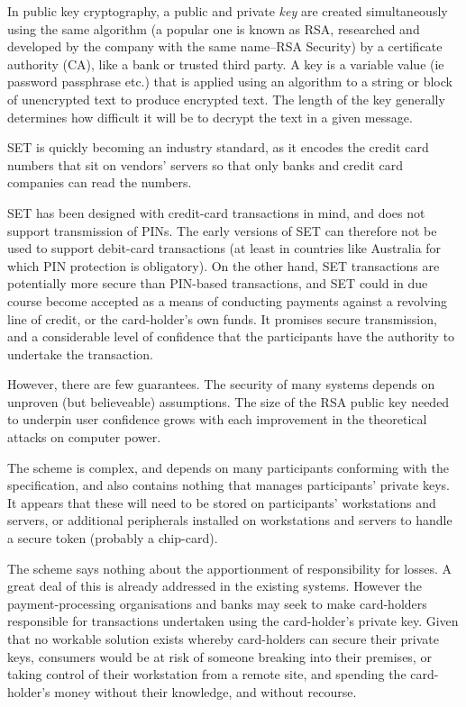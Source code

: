 \documentclass[11pt,a4paper,twoside,notitlepage]{article}
\begin{document}
	In public key cryptography, a public and private \emph{key} are created
simultaneously using the same algorithm (a popular one is known as RSA, researched and developed by the company with
the same name--RSA Security)
by a certificate authority (CA), like a bank or trusted third party\cite{Horadam:Age99}.
A key is a variable value (ie password passphrase etc.) that is applied using an algorithm 
to a string or block 
of unencrypted text to produce encrypted text. The
length of the key generally determines how difficult it will be to decrypt the text in a given message.

 SET is quickly becoming an industry standard, as it encodes
the credit card
numbers that sit on vendors' servers so that only banks and credit card companies can read the 
numbers\cite{Clarke:url99}.

SET has been designed with credit-card transactions in mind, and does not support transmission of PINs.
The early versions of SET can therefore not be used to
support debit-card transactions (at least in countries like Australia for which PIN protection is obligatory).
On the other hand, SET transactions are potentially
more secure than PIN-based transactions, and SET could in due course become accepted as a means of conducting
payments against a revolving line of credit,
or the card-holder's own funds.
It promises secure transmission, and a considerable level of confidence that the participants have the authority to undertake the transaction.


However, there are few guarantees.  The security of many systems depends on unproven (but believeable)
assumptions.  The size of the RSA public key needed to underpin user confidence grows with each 
improvement in the theoretical attacks on computer power\cite{Horadam:Age99}.

The scheme is complex, and depends on many participants conforming with the specification, and also
contains nothing that manages participants' private keys. It appears that these will need to be stored on 
participants' workstations and servers, or
additional peripherals installed on workstations and servers to handle a secure token (probably a chip-card).

The scheme says nothing about the apportionment of responsibility for losses. A great deal of this 
is already addressed
in the existing systems. However the
payment-processing organisations and banks may seek to make card-holders responsible for transactions undertaken
using the card-holder's private key. Given
that no workable solution exists whereby card-holders can secure their private keys, consumers would be at risk of 
someone breaking into their premises, or
taking control of their workstation from a remote site, and spending the card-holder's money without their knowledge, 
and without recourse.
\end{document}
